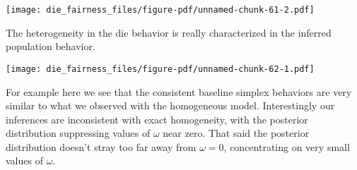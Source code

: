 \documentclass[
  letterpaper,
  DIV=11,
  numbers=noendperiod]{scrartcl}
\newenvironment{Shaded}{\begin{snugshade}}{\end{snugshade}}
\newcommand{\AttributeTok}[1]{\textcolor[rgb]{0.40,0.45,0.13}{#1}}
\newcommand{\ControlFlowTok}[1]{\textcolor[rgb]{0.00,0.23,0.31}{#1}}
\newcommand{\DecValTok}[1]{\textcolor[rgb]{0.68,0.00,0.00}{#1}}
\newcommand{\FloatTok}[1]{\textcolor[rgb]{0.68,0.00,0.00}{#1}}
\newcommand{\FunctionTok}[1]{\textcolor[rgb]{0.28,0.35,0.67}{#1}}
\newcommand{\NormalTok}[1]{\textcolor[rgb]{0.00,0.23,0.31}{#1}}
\newcommand{\OtherTok}[1]{\textcolor[rgb]{0.00,0.23,0.31}{#1}}
\newcommand{\SpecialCharTok}[1]{\textcolor[rgb]{0.37,0.37,0.37}{#1}}
\newcommand{\StringTok}[1]{\textcolor[rgb]{0.13,0.47,0.30}{#1}}
\begin{document}
\texttt{[image: die\_fairness\_files/figure-pdf/unnamed-chunk-61-2.pdf]}

The heterogeneity in the die behavior is really characterized in the
inferred population behavior.

\begin{Shaded}
\end{Shaded}

\texttt{[image: die\_fairness\_files/figure-pdf/unnamed-chunk-62-1.pdf]}

For example here we see that the consistent baseline simplex behaviors
are very similar to what we observed with the homogeneous model.
Interestingly our inferences are inconsistent with exact homogeneity,
with the posterior distribution suppressing values of \(\omega\) near
zero. That said the posterior distribution doesn't stray too far away
from \(\omega = 0\), concentrating on very small values of \(\omega\).
\end{document}
